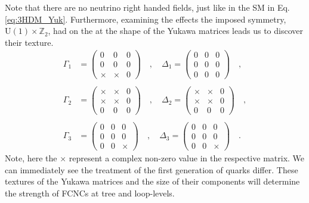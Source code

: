 Note that there are no neutrino right handed fields, just like in the SM in Eq. \ref{eq:3HDM_Yuk}. 
%
Furthermore, examining the effects the imposed symmetry, $\mathrm{U}(1)\times\mathbb{Z}_2$, had on the at the shape of the Yukawa matrices leads us to discover their texture.  
%
\begin{equation}
\begin{split}
\Gamma_1 & = \begin{pmatrix}
0 & 0 & 0\\
0 & 0 & 0\\
\times & \times & 0
\end{pmatrix}
\quad , \quad 
\Delta_1 = \begin{pmatrix}
0 & 0 & 0\\
0 & 0 & 0\\
0 & 0 & 0
\end{pmatrix} \quad , \\
& \\
\Gamma_2 & = \begin{pmatrix}
\times & \times & 0\\
\times & \times & 0\\
0 & 0 & 0
\end{pmatrix}
\quad , \quad 
\Delta_2 = \begin{pmatrix}
\times & \times & 0\\
\times & \times & 0\\
0 & 0 & 0
\end{pmatrix} \quad , \\ 
& \\ 
\Gamma_3 & = \begin{pmatrix}
0 & 0 & 0\\
0 & 0 & 0\\
0 & 0 & \times
\end{pmatrix}
\quad , \quad 
\Delta_3 = \begin{pmatrix}
0 & 0 & 0\\
0 & 0 & 0\\
0 & 0 & \times
\end{pmatrix} \quad . 
\end{split} 
\end{equation}
Note, here the $\times$ represent a complex non-zero value in the respective matrix. 
%
We can immediately see the treatment of the first generation of quarks differ. 
%
%
These textures of the Yukawa matrices and the size of their components will determine the strength of FCNCs at tree and loop-levels. 
